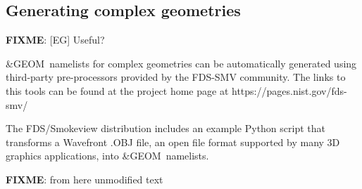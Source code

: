 \documentclass[12pt]{article}
\begin{document}
\subsection{Generating complex geometries}

\textbf{FIXME}: [EG] Useful?

{\ct \&GEOM}\ namelists for complex geometries can be automatically generated using third-party pre-processors
provided by the FDS-SMV community. The links to this tools can be found at the project home page at https://pages.nist.gov/fds-smv/

The FDS/Smokeview distribution includes an example Python script that transforms a Wavefront .OBJ file,
an open file format supported by many 3D graphics applications, into {\ct \&GEOM}\ namelists.






\textbf{FIXME}: from here unmodified text
\end{document}
